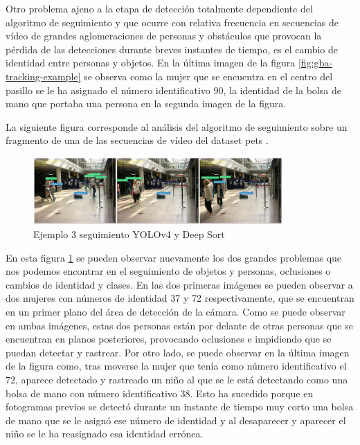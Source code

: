 Otro problema ajeno a la etapa de detección totalmente dependiente del algoritmo de seguimiento y que ocurre con relativa frecuencia en secuencias de vídeo de grandes aglomeraciones de personas y obstáculos que provocan la pérdida de las detecciones durante breves instantes de tiempo, es el cambio de identidad entre personas y objetos. En la última imagen de la figura \ref{fig:gba-tracking-example} se observa como la mujer que se encuentra en el centro del pasillo se le ha asignado el número identificativo 90, la identidad de la bolsa de mano que portaba una persona en la segunda imagen de la figura.

La siguiente figura corresponde al análisis del algoritmo de seguimiento sobre un fragmento de una de las secuencias de vídeo del dataset \gls{pets} \cite{pets2007-dataset}.

\begin{figure}[ht]
\centering
\includegraphics[width=0.85\textwidth]{img/chapters/resultados/tracking/pets-tracking-result-example.jpg}
\caption{\label{fig:pets2007-tracking-example}Ejemplo 3 seguimiento YOLOv4 y Deep Sort \cite{pets2007-dataset}}
\end{figure}

En esta figura \ref{fig:pets2007-tracking-example} se pueden observar nuevamente los dos grandes problemas que nos podemos encontrar en el seguimiento de objetos y personas, oclusiones o cambios de identidad y clases. En las dos primeras imágenes se pueden observar a dos mujeres con números de identidad 37 y 72 respectivamente, que se encuentran en un primer plano del área de detección de la cámara. Como se puede observar en ambas imágenes, estas dos personas están por delante de otras personas que se encuentran en planos posteriores, provocando oclusiones e impidiendo que se puedan detectar y rastrear. Por otro lado, se puede observar en la última imagen de la figura como, tras moverse la mujer que tenía como número identificativo el 72, aparece detectado y rastreado un niño al que se le está detectando como una bolsa de mano con número identificativo 38. Esto ha sucedido porque en fotogramas previos se detectó durante un instante de tiempo muy corto una bolsa de mano que se le asignó ese número de identidad y al desaparecer y aparecer el niño se le ha reasignado esa identidad errónea.

